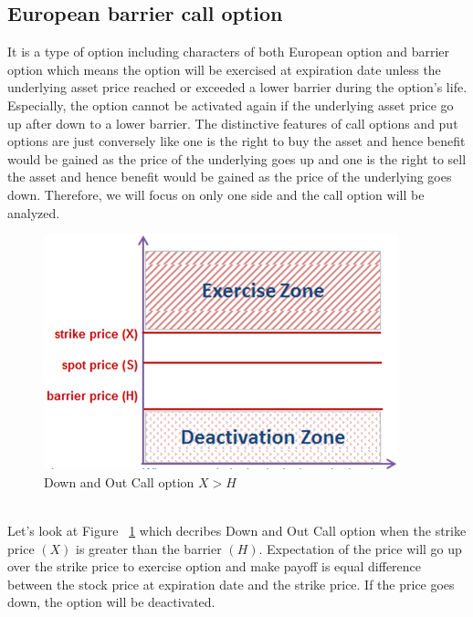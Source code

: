 	\subsection{European barrier call option}
	It is a type of option including characters of both European option and barrier option which means the option will be exercised at expiration date unless the underlying asset price reached or exceeded a lower barrier during the option's life. Especially, the option cannot be activated again if the underlying asset price go up after down to a lower barrier. The distinctive features of call options and put options are just conversely like one is the right to buy the asset and hence benefit would be gained as the price of the underlying goes up and one is the right to sell the asset and hence benefit would be gained as the price of the underlying goes down. Therefore, we will focus on only one side and the call option will be analyzed.\\
		\begin{figure}[htp]
		\begin{center}
			\includegraphics[scale=0.9]{figure1}
		\caption{Down and Out Call option $X > H$}
		\label{reffig1} 
	    \end{center}
     	\end{figure} \\
    Let's look at Figure ~\ref{reffig1}  which decribes Down and Out Call option when the strike price $(X)$ is greater than the barrier $(H)$. Expectation of the price will go up over the strike price to exercise option and make payoff is equal difference between the stock price at expiration date and the strike price. If the price goes down, the option will be deactivated.   
